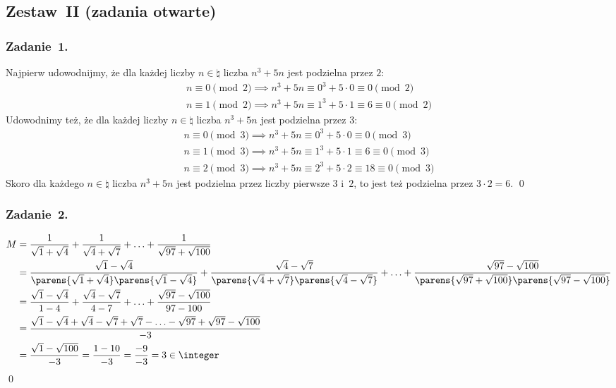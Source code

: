 \subsection*{Zestaw~II (zadania otwarte)}
\subsubsection*{Zadanie~1.}
Najpierw udowodnijmy, że dla każdej liczby \(n \in \natural\) liczba \(n^3 + 5n\) jest podzielna przez \(2\):
\begin{gather*}
    n \equiv 0 \pmod{2} \implies n^3 + 5n \equiv 0^3 + 5 \cdot 0 \equiv 0 \pmod{2}\\
    n \equiv 1 \pmod{2} \implies n^3 + 5n \equiv 1^3 + 5 \cdot 1 \equiv 6 \equiv 0 \pmod{2}
\end{gather*}
Udowodnimy też, że dla każdej liczby \(n \in \natural\) liczba \(n^3 + 5n\) jest podzielna przez \(3\):
\begin{gather*}
    n \equiv 0 \pmod{3} \implies n^3 + 5n \equiv 0^3 + 5 \cdot 0 \equiv 0 \pmod{3}\\
    n \equiv 1 \pmod{3} \implies n^3 + 5n \equiv 1^3 + 5 \cdot 1 \equiv 6 \equiv 0 \pmod{3}\\
    n \equiv 2 \pmod{3} \implies n^3 + 5n \equiv 2^3 + 5 \cdot 2 \equiv 18 \equiv 0 \pmod{3}
\end{gather*}
Skoro dla każdego \(n \in \natural\) liczba \(n^3 + 5n\) jest podzielna przez liczby pierwsze \(3\) i~\(2\), to jest też podzielna przez \(3 \cdot 2 = 6\).
\qed
\subsubsection*{Zadanie~2.}
\begin{equation*}
    \begin{split}
        M &= \frac{1}{\sqrt{1} + \sqrt{4}} + \frac{1}{\sqrt{4} + \sqrt{7}} + \ldots + \frac{1}{\sqrt{97} + \sqrt{100}}\\
            &= \frac{\sqrt{1} - \sqrt{4}}{\parens{\sqrt{1} + \sqrt{4}} \parens{\sqrt{1} - \sqrt{4}}} + \frac{\sqrt{4} - \sqrt{7}}{\parens{\sqrt{4} + \sqrt{7}} \parens{\sqrt{4} - \sqrt{7}}} + \ldots + \frac{\sqrt{97} - \sqrt{100}}{\parens{\sqrt{97} + \sqrt{100}} \parens{\sqrt{97} - \sqrt{100}}}\\
            &= \frac{\sqrt{1} - \sqrt{4}}{1 - 4} + \frac{\sqrt{4} - \sqrt{7}}{4 - 7} + \ldots + \frac{\sqrt{97} - \sqrt{100}}{97 - 100}\\
            &= \frac{\sqrt{1} - \sqrt{4} + \sqrt{4} - \sqrt{7} + \sqrt{7} - \ldots - \sqrt{97} + \sqrt{97} - \sqrt{100}}{-3}\\
            &= \frac{\sqrt{1} - \sqrt{100}}{-3}
            = \frac{1 - 10}{-3}
            = \frac{-9}{-3}
            = 3 \in \integer
    \end{split}
\end{equation*}
\qed
